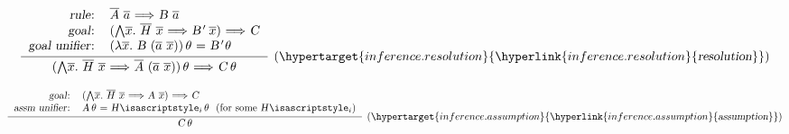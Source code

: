 \begin{isabellebody}
\begin{isamarkuptext}
  \[
  \infer[(\indexdef{}{inference}{resolution}\hypertarget{inference.resolution}{\hyperlink{inference.resolution}{\mbox{\isa{resolution}}}})]
  {\isa{{\isachardoublequote}{\isacharparenleft}{\isasymAnd}\isactrlvec x{\isachardot}\ \isactrlvec H\ \isactrlvec x\ {\isasymLongrightarrow}\ \isactrlvec A\ {\isacharparenleft}\isactrlvec a\ \isactrlvec x{\isacharparenright}{\isacharparenright}{\isasymvartheta}\ {\isasymLongrightarrow}\ C{\isasymvartheta}{\isachardoublequote}}}
  {\begin{tabular}{rl}
    \isa{{\isachardoublequote}rule{\isacharcolon}{\isachardoublequote}} &
    \isa{{\isachardoublequote}\isactrlvec A\ \isactrlvec a\ {\isasymLongrightarrow}\ B\ \isactrlvec a{\isachardoublequote}} \\
    \isa{{\isachardoublequote}goal{\isacharcolon}{\isachardoublequote}} &
    \isa{{\isachardoublequote}{\isacharparenleft}{\isasymAnd}\isactrlvec x{\isachardot}\ \isactrlvec H\ \isactrlvec x\ {\isasymLongrightarrow}\ B{\isacharprime}\ \isactrlvec x{\isacharparenright}\ {\isasymLongrightarrow}\ C{\isachardoublequote}} \\
    \isa{{\isachardoublequote}goal\ unifier{\isacharcolon}{\isachardoublequote}} &
    \isa{{\isachardoublequote}{\isacharparenleft}{\isasymlambda}\isactrlvec x{\isachardot}\ B\ {\isacharparenleft}\isactrlvec a\ \isactrlvec x{\isacharparenright}{\isacharparenright}{\isasymvartheta}\ {\isacharequal}\ B{\isacharprime}{\isasymvartheta}{\isachardoublequote}} \\
   \end{tabular}}
  \]

  \medskip

  \[
  \infer[(\indexdef{}{inference}{assumption}\hypertarget{inference.assumption}{\hyperlink{inference.assumption}{\mbox{\isa{assumption}}}})]{\isa{{\isachardoublequote}C{\isasymvartheta}{\isachardoublequote}}}
  {\begin{tabular}{rl}
    \isa{{\isachardoublequote}goal{\isacharcolon}{\isachardoublequote}} &
    \isa{{\isachardoublequote}{\isacharparenleft}{\isasymAnd}\isactrlvec x{\isachardot}\ \isactrlvec H\ \isactrlvec x\ {\isasymLongrightarrow}\ A\ \isactrlvec x{\isacharparenright}\ {\isasymLongrightarrow}\ C{\isachardoublequote}} \\
    \isa{{\isachardoublequote}assm\ unifier{\isacharcolon}{\isachardoublequote}} & \isa{{\isachardoublequote}A{\isasymvartheta}\ {\isacharequal}\ H\isactrlsub i{\isasymvartheta}{\isachardoublequote}}~~\text{(for some~\isa{{\isachardoublequote}H\isactrlsub i{\isachardoublequote}})} \\
   \end{tabular}}
  \]


\end{isamarkuptext}
\end{isabellebody}
